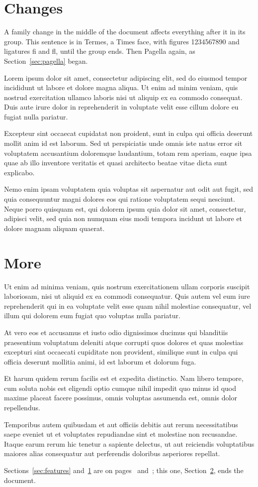\documentclass{article}
\begin{document}
\section{Changes}\label{sec:changes}
A family change in the middle of the document affects everything after it in its group.
{This sentence is in Termes, a Times face, with
figures 1234567890 and ligatures fi and fl, until the group ends.} Then Pagella again,
as Section~\ref{sec:pagella} began.

Lorem ipsum dolor sit amet, consectetur adipiscing elit, sed do eiusmod tempor
incididunt ut labore et dolore magna aliqua. Ut enim ad minim veniam, quis nostrud
exercitation ullamco laboris nisi ut aliquip ex ea commodo consequat. Duis aute irure
dolor in reprehenderit in voluptate velit esse cillum dolore eu fugiat nulla pariatur.

Excepteur sint occaecat cupidatat non proident, sunt in culpa qui officia deserunt
mollit anim id est laborum. Sed ut perspiciatis unde omnis iste natus error sit
voluptatem accusantium doloremque laudantium, totam rem aperiam, eaque ipsa quae ab
illo inventore veritatis et quasi architecto beatae vitae dicta sunt explicabo.

Nemo enim ipsam voluptatem quia voluptas sit aspernatur aut odit aut fugit, sed quia
consequuntur magni dolores eos qui ratione voluptatem sequi nesciunt. Neque porro
quisquam est, qui dolorem ipsum quia dolor sit amet, consectetur, adipisci velit, sed
quia non numquam eius modi tempora incidunt ut labore et dolore magnam aliquam quaerat.

\section{More}\label{sec:more}
Ut enim ad minima veniam, quis nostrum exercitationem ullam corporis suscipit
laboriosam, nisi ut aliquid ex ea commodi consequatur. Quis autem vel eum iure
reprehenderit qui in ea voluptate velit esse quam nihil molestiae consequatur, vel
illum qui dolorem eum fugiat quo voluptas nulla pariatur.

At vero eos et accusamus et iusto odio dignissimos ducimus qui blanditiis praesentium
voluptatum deleniti atque corrupti quos dolores et quas molestias excepturi sint
occaecati cupiditate non provident, similique sunt in culpa qui officia deserunt
mollitia animi, id est laborum et dolorum fuga.

Et harum quidem rerum facilis est et expedita distinctio. Nam libero tempore, cum soluta
nobis est eligendi optio cumque nihil impedit quo minus id quod maxime placeat facere
possimus, omnis voluptas assumenda est, omnis dolor repellendus.

Temporibus autem quibusdam et aut officiis debitis aut rerum necessitatibus saepe
eveniet ut et voluptates repudiandae sint et molestiae non recusandae. Itaque earum
rerum hic tenetur a sapiente delectus, ut aut reiciendis voluptatibus maiores alias
consequatur aut perferendis doloribus asperiores repellat.

Sections~\ref{sec:features} and~\ref{sec:changes} are on pages~\pageref{sec:features}
and~\pageref{sec:changes}; this one, Section~\ref{sec:more}, ends the document.
\end{document}
